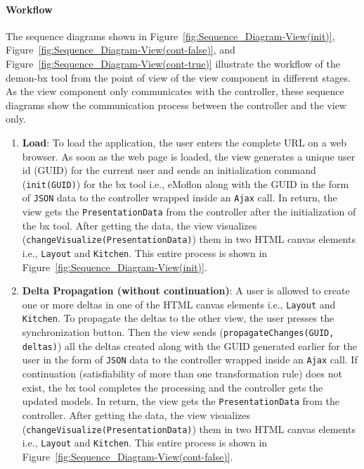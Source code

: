 \paragraph{Workflow}
The sequence diagrams shown in Figure~\ref{fig:Sequence_Diagram-View(init)}, Figure~\ref{fig:Sequence_Diagram-View(cont-false)}, and Figure~\ref{fig:Sequence_Diagram-View(cont-true)} illustrate the workflow of the demon-bx tool from the point of view of the view component in different stages. As the view component only communicates with the controller, these sequence diagrams show the communication process between the controller and the view only.

\begin{enumerate}
	\item {\textbf{Load}: To load the application, the user enters the complete URL on a web browser. As soon as the web page is loaded, the view generates a unique user id (GUID) for the current user and sends an initialization command (\texttt{init(GUID)}) for the bx tool i.e., eMoflon along with the GUID in the form of \texttt{JSON} data to the controller wrapped inside an \texttt{Ajax} call. In return, the view gets the \texttt{PresentationData} from the controller after the initialization of the bx tool. After getting the data, the view visualizes (\texttt{changeVisualize(PresentationData)}) them in two HTML canvas elements i.e., \texttt{Layout} and \texttt{Kitchen}. This entire process is shown in Figure~\ref{fig:Sequence_Diagram-View(init)}.}
	
	\item {\textbf{Delta Propagation (without continuation)}: A user is allowed to create one or more deltas in one of the HTML canvas elements i.e., \texttt{Layout} and \texttt{Kitchen}. To propagate the deltas to the other view, the user presses the synchronization button. Then the view sends (\texttt{propagateChanges(GUID, deltas)}) all the deltas created along with the GUID generated earlier for the user in the form of \texttt{JSON} data to the controller wrapped inside an \texttt{Ajax} call. If continuation (satisfiability of more than one transformation rule) does not exist, the bx tool completes the processing and the controller gets the updated models. In return, the view gets the \texttt{PresentationData} from the controller. After getting the data, the view visualizes (\texttt{changeVisualize(PresentationData)}) them in two HTML canvas elements i.e., \texttt{Layout} and \texttt{Kitchen}. This entire process is shown in Figure~\ref{fig:Sequence_Diagram-View(cont-false)}.}
	

\end{enumerate}
